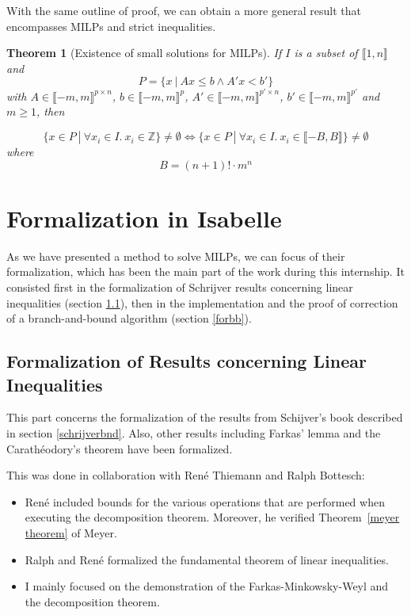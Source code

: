 \documentclass{article}
\newcommand{\ints}{\mathbb{Z}}
\newtheorem{theorem}{Theorem}
\begin{document}
With the same outline of proof, we can obtain a more general result that
encompasses MILPs and strict inequalities. 

\begin{theorem}[Existence of small solutions for MILPs]
  \label{small-milp}
  If $I$ is a subset of $\llbracket 1, n \rrbracket$ and
  $$P = \{x~|~Ax \leqslant b \wedge A'x < b'\}$$ with
  $A \in \llbracket -m, m \rrbracket^{p \times n}$,
  $b \in \llbracket -m, m \rrbracket^p$,
  $A' \in \llbracket -m, m \rrbracket^{p' \times n}$,
  $b' \in \llbracket -m, m \rrbracket^{p'}$ and $m \geqslant 1$, then

  $$\{x \in P~|~\forall x_i \in I.~x_i \in \ints\} \neq \emptyset
      \Longleftrightarrow
    \{x \in P~|~\forall x_i \in I.~x_i \in \llbracket -B, B \rrbracket\}
      \neq \emptyset$$
  where
  $$B = (n + 1)! \cdot m^n$$
\end{theorem}

\section{Formalization in Isabelle}
As we have presented a method to solve MILPs, we can focus of their
formalization, which has been the main part of the work during this internship.
It consisted first in the formalization of Schrijver results concerning linear
inequalities (section \ref{forlineq}), then in the implementation and the proof
of correction of a branch-and-bound algorithm (section \ref{forbb}).

\subsection{Formalization of Results concerning Linear Inequalities}
\label{forlineq}
This part concerns the formalization of the results from Schijver's book
described in section \ref{schrijverbnd}.
Also, other results including Farkas' lemma and the Carathéodory's theorem
have been formalized.

This was done in collaboration with René Thiemann and Ralph Bottesch:
\begin{itemize}
  \item René included bounds for the various operations that are performed 
  when executing the decomposition theorem.  Moreover, he verified Theorem~\ref{meyer theorem}
  of Meyer. 
  \item Ralph and René formalized the fundamental theorem of linear
    inequalities.
  \item I mainly focused on the demonstration of the Farkas-Minkowsky-Weyl and
    the decomposition theorem.
\end{itemize}
\end{document}
